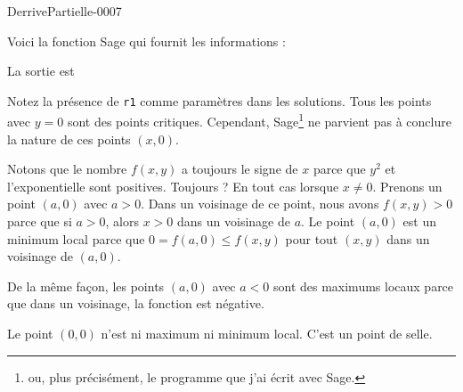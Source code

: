 
\begin{corrige}{DerrivePartielle-0007}

	Voici la fonction Sage qui fournit les informations :

	

	La sortie est


	Notez la présence de \verb+r1+ comme paramètres dans les solutions. Tous les points avec $y=0$ sont des points critiques. Cependant, Sage\footnote{ou, plus précisément, le programme que j'ai écrit avec Sage.} ne parvient pas à conclure la nature de ces points $(x,0)$.

	Notons que le nombre $f(x,y)$ a toujours le signe de $x$ parce que $y^2$ et l'exponentielle sont positives. Toujours ? En tout cas lorsque $x\neq 0$. Prenons un point $(a,0)$ avec $a>0$. Dans un voisinage de ce point, nous avons $f(x,y)>0$ parce que si $a>0$, alors $x>0$ dans un voisinage de $a$. Le point $(a,0)$ est un minimum local parce que $0=f(a,0)\leq f(x,y)$ pour tout $(x,y)$ dans un voisinage de $(a,0)$.

	De la même façon, les points $(a,0)$ avec $a<0$ sont des maximums locaux parce que dans un voisinage, la fonction est négative. 

	Le point $(0,0)$ n'est ni maximum ni minimum local. C'est un point de selle.

\end{corrige}
